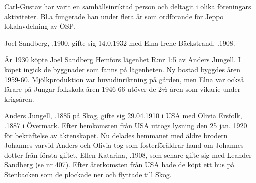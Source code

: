 Carl-Gustav har varit en samhällsinriktad person och deltagit i olika föreningars aktiviteter. Bl.a fungerade han under flera år som
ordförande för Jeppo lokalavdelning av ÖSP.
\begin{jhchildren}
  \item {}
  \item {}
  \item {}
  \item {}
\end{jhchildren}





Joel Sandberg, .1900, gifte sig 14.0.1932 med Elna Irene Bäckstrand, .1908.

År 1930 köpte Joel Sandberg Hemfors lägenhet R:nr 1:5 av Anders Jungell. I köpet ingick de byggnader som fanns på lägenheten. Ny bostad byggdes åren 1959-60. Mjölkproduktion var huvudinriktning på gården, men Elna var också lärare på Jungar folkskola åren 1946-66 utöver de 2½ åren som vikarie under krigsåren.
\begin{jhchildren}
  \item {}
  \item {}
  \item {}
  \item {}
\end{jhchildren}


Anders Jungell, .1885 på Skog, gifte sig  29.04.1910 i USA med Olivia Ersfolk, .1887 i Övermark. Efter hemkomsten från USA uttogs lysning den 25 jan. 1920 för bekräftelse av äktenskapet. Nu delades hemmanet med äldre brodern Johannes varvid Anders och Olivia tog som fosterföräldrar hand om Johannes dotter från första giftet, Ellen Katarina, .1908, som senare gifte sig med Leander Sandberg (se nr 407). Efter återkomsten från USA hade de  köpt  ett hus på Stenbacken som de plockade ner och flyttade till Skog.

